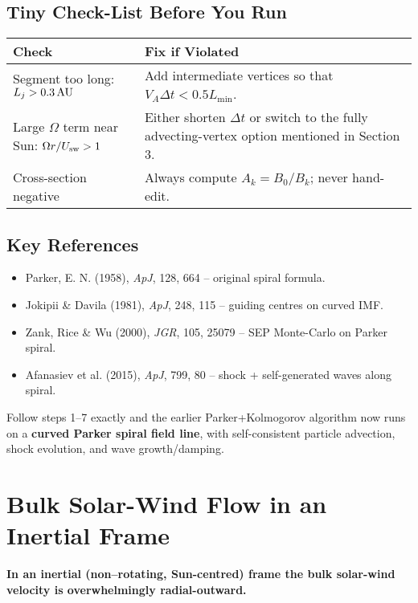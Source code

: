 \subsection*{Tiny Check-List Before You Run}

\begin{tabular}{|p{5.5cm}|p{9cm}|}
\hline
\textbf{Check} & \textbf{Fix if Violated} \\
\hline
Segment too long: $L_j > 0.3\,{\rm AU}$ & Add intermediate vertices so that $V_A \Delta t < 0.5 L_{\min}$. \\
\hline
Large $\Omega$ term near Sun: $\Omega r / U_{\rm sw} > 1$ & Either shorten $\Delta t$ or switch to the fully advecting-vertex option mentioned in Section 3. \\
\hline
Cross-section negative & Always compute $A_k = B_0/B_k$; never hand-edit. \\
\hline
\end{tabular}

\subsection*{Key References}

\begin{itemize}
    \item Parker, E. N. (1958), \textit{ApJ}, 128, 664 – original spiral formula.
    \item Jokipii \& Davila (1981), \textit{ApJ}, 248, 115 – guiding centres on curved IMF.
    \item Zank, Rice \& Wu (2000), \textit{JGR}, 105, 25079 – SEP Monte-Carlo on Parker spiral.
    \item Afanasiev et al. (2015), \textit{ApJ}, 799, 80 – shock + self-generated waves along spiral.
\end{itemize}

\noindent
Follow steps 1–7 exactly and the earlier Parker+Kolmogorov algorithm now runs on a \textbf{curved Parker spiral field line}, with self-consistent particle advection, shock evolution, and wave growth/damping.


\section*{Bulk Solar-Wind Flow in an Inertial Frame}

\textbf{In an inertial (non--rotating, Sun-centred) frame the bulk solar-wind velocity is overwhelmingly \textbf{radial-outward}.}


